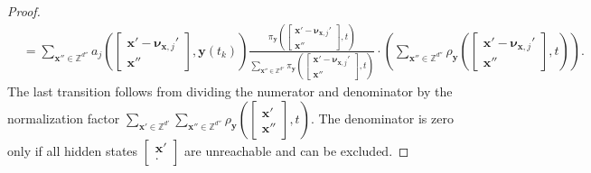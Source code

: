\begin{proof}
\begin{align*}
        &= \sum_{\boldsymbol{x}'' \in \mathbb{Z}^{d''}} a_j \left( \begin{bmatrix} \boldsymbol{x}' - \boldsymbol{\nu}_{\boldsymbol{x}, j}' \\ \boldsymbol{x}'' \end{bmatrix}, \boldsymbol{y}(t_k) \right) \frac{ \pi_{\boldsymbol{y}} \left( \begin{bmatrix} \boldsymbol{x}' - \boldsymbol{\nu}_{\boldsymbol{x}, j}' \\ \boldsymbol{x}'' \end{bmatrix}, t \right) }{ \sum\limits_{\boldsymbol{x}'' \in \mathbb{Z}^{d''}} \pi_{\boldsymbol{y}} \left( \begin{bmatrix} \boldsymbol{x}' - \boldsymbol{\nu}_{\boldsymbol{x}, j}' \\ \boldsymbol{x}'' \end{bmatrix}, t \right) } \cdot \left( \sum_{\boldsymbol{x}'' \in \mathbb{Z}^{d''}} \rho_{\boldsymbol{y}} \left( \begin{bmatrix} \boldsymbol{x}' - \boldsymbol{\nu}_{\boldsymbol{x}, j}' \\ \boldsymbol{x}'' \end{bmatrix}, t \right) \right) .
    \end{align*}
    The last transition follows from dividing the numerator and denominator by the normalization factor $\sum\limits_{\boldsymbol{x}' \in \mathbb{Z}^{d'}} \sum\limits_{\boldsymbol{x}'' \in \mathbb{Z}^{d''}} \rho_{\boldsymbol{y}} \left( \begin{bmatrix} \boldsymbol{x}' \\ \boldsymbol{x}'' \end{bmatrix}, t \right)$. The denominator is zero only if all hidden states $\begin{bmatrix} \boldsymbol{x}' \\ \cdot \end{bmatrix}$ are unreachable and can be excluded.
    

\end{proof}
